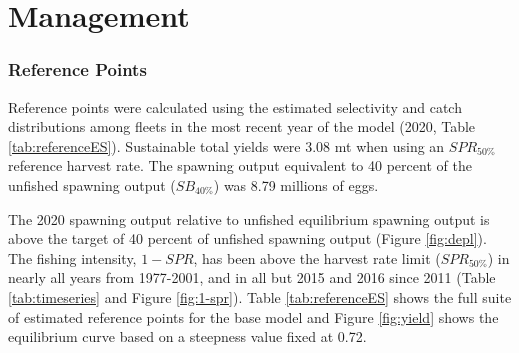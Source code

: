 \documentclass[11pt,
  english,
  a4paper,
]{article}
\begin{document}

\hypertarget{management}{%
\section{Management}\label{management}}

\leavevmode\tagmcend\tagstructend


\hypertarget{reference-points}{%
\subsubsection{Reference Points}\label{reference-points}}

\leavevmode\tagmcend\tagstructend


Reference points were calculated using the estimated selectivity and catch distributions among fleets in the most recent year of the model (2020, Table \ref{tab:referenceES}). Sustainable total yields were 3.08 mt when using an {\(SPR_{50\%}\)\leavevmode\tagmcend\tagstructend} reference harvest rate. The spawning output equivalent to 40 percent of the unfished spawning output ({\(SB_{40\%}\)\leavevmode\tagmcend\tagstructend}) was 8.79 millions of eggs.

\leavevmode\tagmcend\tagstructend\par


The 2020 spawning output relative to unfished equilibrium spawning output is above the target of 40 percent of unfished spawning output (Figure \ref{fig:depl}). The fishing intensity, {\(1-SPR\)\leavevmode\tagmcend\tagstructend}, has been above the harvest rate limit ({\(SPR_{50\%}\)\leavevmode\tagmcend\tagstructend}) in nearly all years from 1977-2001, and in all but 2015 and 2016 since 2011 (Table \ref{tab:timeseries} and Figure \ref{fig:1-spr}). Table \ref{tab:referenceES} shows the full suite of estimated reference points for the base model and Figure \ref{fig:yield} shows the equilibrium curve based on a steepness value fixed at 0.72.

\leavevmode\tagmcend\tagstructend\par
\end{document}
